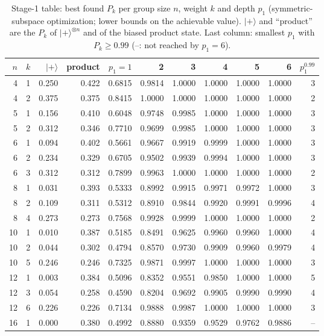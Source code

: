 \begin{table}[t]\centering\small
\caption{Stage-1 table: best found $P_k$ per group size $n$, weight $k$ and depth $p_1$ (symmetric-subspace optimization; lower bounds on the achievable value). $|+\rangle$ and ``product'' are the $P_k$ of $|+\rangle^{\otimes n}$ and of the biased product state. Last column: smallest $p_1$ with $P_k\ge0.99$ (--: not reached by $p_1=6$).}
\label{tab:stage1}
\begin{tabular}{rrrrrrrrrrr}\toprule
$n$ & $k$ & $|+\rangle$ & product & $p_1{=}1$ & 2 & 3 & 4 & 5 & 6 & $p_1^{0.99}$\\\midrule
4 & 1 & 0.250 & 0.422 & 0.6815 & 0.9814 & 1.0000 & 1.0000 & 1.0000 & 1.0000 & 3\\
4 & 2 & 0.375 & 0.375 & 0.8415 & 1.0000 & 1.0000 & 1.0000 & 1.0000 & 1.0000 & 2\\
5 & 1 & 0.156 & 0.410 & 0.6048 & 0.9748 & 0.9985 & 1.0000 & 1.0000 & 1.0000 & 3\\
5 & 2 & 0.312 & 0.346 & 0.7710 & 0.9699 & 0.9985 & 1.0000 & 1.0000 & 1.0000 & 3\\
6 & 1 & 0.094 & 0.402 & 0.5661 & 0.9667 & 0.9919 & 0.9999 & 1.0000 & 1.0000 & 3\\
6 & 2 & 0.234 & 0.329 & 0.6705 & 0.9502 & 0.9939 & 0.9994 & 1.0000 & 1.0000 & 3\\
6 & 3 & 0.312 & 0.312 & 0.7899 & 0.9963 & 1.0000 & 1.0000 & 1.0000 & 1.0000 & 2\\
8 & 1 & 0.031 & 0.393 & 0.5333 & 0.8992 & 0.9915 & 0.9971 & 0.9972 & 1.0000 & 3\\
8 & 2 & 0.109 & 0.311 & 0.5312 & 0.8910 & 0.9844 & 0.9920 & 0.9991 & 0.9996 & 4\\
8 & 4 & 0.273 & 0.273 & 0.7568 & 0.9928 & 0.9999 & 1.0000 & 1.0000 & 1.0000 & 2\\
10 & 1 & 0.010 & 0.387 & 0.5185 & 0.8491 & 0.9625 & 0.9960 & 0.9960 & 1.0000 & 4\\
10 & 2 & 0.044 & 0.302 & 0.4794 & 0.8570 & 0.9730 & 0.9909 & 0.9960 & 0.9979 & 4\\
10 & 5 & 0.246 & 0.246 & 0.7325 & 0.9871 & 0.9997 & 1.0000 & 1.0000 & 1.0000 & 3\\
12 & 1 & 0.003 & 0.384 & 0.5096 & 0.8352 & 0.9551 & 0.9850 & 1.0000 & 1.0000 & 5\\
12 & 3 & 0.054 & 0.258 & 0.4590 & 0.8204 & 0.9692 & 0.9905 & 0.9990 & 0.9990 & 4\\
12 & 6 & 0.226 & 0.226 & 0.7134 & 0.9888 & 0.9987 & 1.0000 & 1.0000 & 1.0000 & 3\\
16 & 1 & 0.000 & 0.380 & 0.4992 & 0.8880 & 0.9359 & 0.9529 & 0.9762 & 0.9886 & --\\

\end{tabular}
\end{table}
